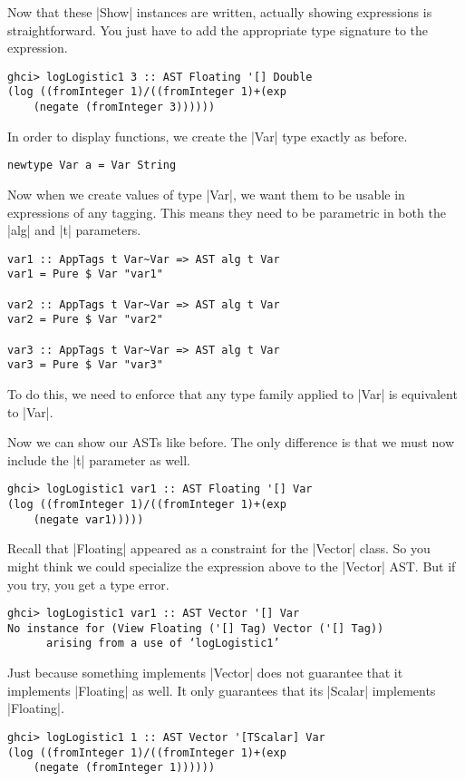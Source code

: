 \documentclass[preprint]{sigplanconf}
\theoremstyle{definition}
\begin{document}
Now that these |Show| instances are written,
actually showing expressions is straightforward.
You just have to add the appropriate type signature to the expression.
\begin{lstlisting}
ghci> logLogistic1 3 :: AST Floating '[] Double
(log ((fromInteger 1)/((fromInteger 1)+(exp
    (negate (fromInteger 3))))))
\end{lstlisting}

In order to display functions,
we create the |Var| type exactly as before.
\begin{lstlisting}
newtype Var a = Var String
\end{lstlisting}
Now when we create values of type |Var|,
we want them to be usable in expressions of any tagging.
This means they need to be parametric in both the |alg| and |t| parameters.
\begin{lstlisting}
var1 :: AppTags t Var~Var => AST alg t Var
var1 = Pure $ Var "var1"

var2 :: AppTags t Var~Var => AST alg t Var
var2 = Pure $ Var "var2"

var3 :: AppTags t Var~Var => AST alg t Var
var3 = Pure $ Var "var3"
\end{lstlisting}
To do this, we need to enforce that any type family applied to |Var| is equivalent to |Var|.

Now we can show our ASTs like before.
The only difference is that we must now include the |t| parameter as well.
\begin{lstlisting}
ghci> logLogistic1 var1 :: AST Floating '[] Var
(log ((fromInteger 1)/((fromInteger 1)+(exp
    (negate var1)))))
\end{lstlisting}
Recall that |Floating| appeared as a constraint for the |Vector| class.
So you might think we could specialize the expression above to the |Vector| AST.
But if you try, you get a type error.
\begin{lstlisting}
ghci> logLogistic1 var1 :: AST Vector '[] Var
No instance for (View Floating ('[] Tag) Vector ('[] Tag))
      arising from a use of ‘logLogistic1’
\end{lstlisting}
Just because something implements |Vector| does not guarantee that it implements |Floating| as well.
It only guarantees that its |Scalar| implements |Floating|.

\begin{lstlisting}
ghci> logLogistic1 1 :: AST Vector '[TScalar] Var
(log ((fromInteger 1)/((fromInteger 1)+(exp
    (negate (fromInteger 1))))))
\end{lstlisting}
\end{document}
